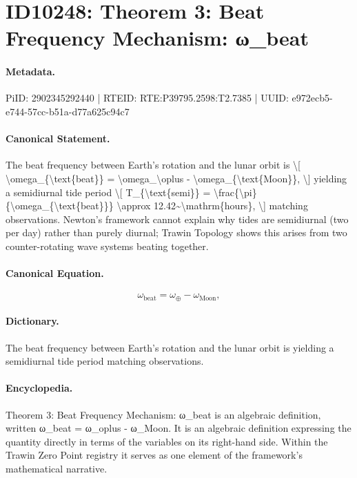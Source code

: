 \section*{ID10248: Theorem 3: Beat Frequency Mechanism: ω\_beat}
\paragraph{Metadata.}
PiID: 2902345292440 | RTEID: RTE:P39795.2598:T2.7385 | UUID: e972ecb5-e744-57cc-b51a-d77a625c94c7

\paragraph{Canonical Statement.}
The beat frequency between Earth's rotation and the lunar orbit is \textbackslash{}[ \textbackslash{}omega\_\{\textbackslash{}text\{beat\}\} = \textbackslash{}omega\_\textbackslash{}oplus - \textbackslash{}omega\_\{\textbackslash{}text\{Moon\}\}, \textbackslash{}] yielding a semidiurnal tide period \textbackslash{}[ T\_\{\textbackslash{}text\{semi\}\} = \textbackslash{}frac\{\textbackslash{}pi\}\{\textbackslash{}omega\_\{\textbackslash{}text\{beat\}\}\} \textbackslash{}approx 12.42\textasciitilde{}\textbackslash{}mathrm\{hours\}, \textbackslash{}] matching observations. Newton's framework cannot explain why tides are semidiurnal (two per day) rather than purely diurnal; Trawin Topology shows this arises from two counter-rotating wave systems beating together.

\paragraph{Canonical Equation.}
\[
\omega_{\text{beat}} = \omega_\oplus - \omega_{\text{Moon}},
\]

\paragraph{Dictionary.}
The beat frequency between Earth's rotation and the lunar orbit is yielding a semidiurnal tide period matching observations.

\paragraph{Encyclopedia.}
Theorem 3: Beat Frequency Mechanism: ω\_beat is an algebraic definition, written ω\_beat = ω\_oplus - ω\_Moon. It is an algebraic definition expressing the quantity directly in terms of the variables on its right-hand side. Within the Trawin Zero Point registry it serves as one element of the framework's mathematical narrative.
